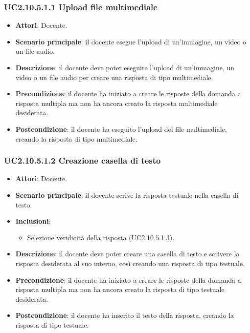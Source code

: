 \subsubsection{UC2.10.5.1.1 Upload file multimediale}
\begin{itemize}
\item \textbf{Attori}: Docente.
\item \textbf{Scenario principale}: il docente esegue l'upload di un'immagine, un video o un file audio.
\item \textbf{Descrizione}: il docente deve poter eseguire l'upload di un'immagine, un video o un file audio per creare una risposta di tipo multimediale.
\item \textbf{Precondizione}: il docente ha iniziato a creare le risposte della domanda a risposta multipla ma non ha ancora creato la risposta multimediale desiderata.
\item \textbf{Postcondizione}: il docente ha eseguito l'upload del file multimediale, creando la risposta di tipo multimediale.
\end{itemize}
\subsubsection{UC2.10.5.1.2 Creazione casella di testo}
\begin{itemize}
\item \textbf{Attori}: Docente.
\item \textbf{Scenario principale}: il docente scrive la risposta testuale nella casella di testo.
\item \textbf{Inclusioni}:
\begin{itemize}
\item Selezione veridicità della risposta (UC2.10.5.1.3).
\end{itemize}
\item \textbf{Descrizione}: il docente deve poter creare una casella di testo e scrivere la risposta desiderata al suo interno, così creando una risposta di tipo testuale.
\item \textbf{Precondizione}: il docente ha iniziato a creare le risposte della domanda a risposta multipla ma non ha ancora creato la risposta di tipo testuale desiderata.
\item \textbf{Postcondizione}: il docente ha inserito il testo della risposta, creando la risposta di tipo testuale.
\end{itemize}
